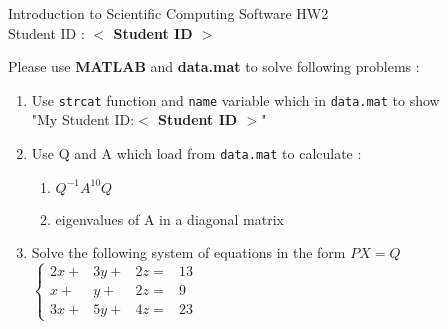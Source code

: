 \documentclass[12pt,a4paper]{article}
\newcommand{\placeholder}[1]{\textbf{$<$ #1 $>$}}
\newcommand{\idnumber}{\placeholder{Student ID}}
\begin{document}
\begin{flushleft}Introduction to Scientific Computing Software HW2
\\Student ID : \idnumber{}\end{flushleft}

Please use \textbf{MATLAB} and \textbf{data.mat} to solve following problems : 
\begin{enumerate}
\item Use \texttt{strcat} function and \texttt{name} variable which in \texttt{data.mat} to show \\"My Student ID:\idnumber{}"
\item Use Q and A which load from \texttt{data.mat} to calculate :
\begin{enumerate}
\item  $Q^{-1}A^{10}Q$
\item  eigenvalues of A in a diagonal matrix
\end{enumerate}
\item Solve the following system of equations in the form $PX=Q$ \\[1em] $\displaystyle{\left\{\begin{array}{rrrl}2x+&3y+&2z=&13\\x+&y+&2z=&9\\3x+&5y+&4z=&23\end{array}\right.}$
\end{enumerate}
\end{document}
